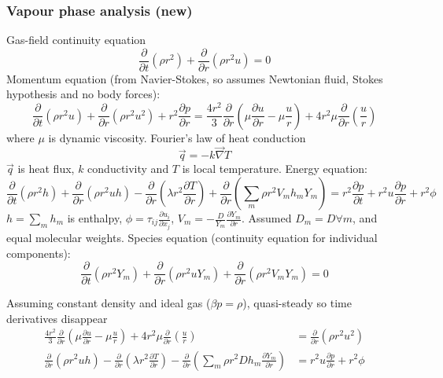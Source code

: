 \documentclass[12pt]{report}
\begin{document}
\subsubsection{Vapour phase analysis (new)}

Gas-field continuity equation
\begin{equation}
  \frac{\partial}{\partial t} ( \rho r^2 ) +
  \frac{\partial}{\partial r} ( \rho r^2 u ) = 0
\end{equation}
Momentum equation (from Navier-Stokes, so assumes Newtonian fluid, Stokes hypothesis and no body forces):
\begin{equation}
  \frac{\partial}{\partial t} ( \rho r^2 u ) +
  \frac{\partial}{\partial r} ( \rho r^2 u^2 ) +
  r^2 \frac{\partial p}{\partial r}
  = \frac{4 r^2}{3} \frac{\partial}{\partial r}
  \left( \mu \frac{\partial u}{\partial r} - \mu \frac{u}{r} \right)
  + 4 r^2 \mu \frac{\partial}{\partial r} \left( \frac{u}{r} \right)
\end{equation}
where $\mu$ is dynamic viscosity.
Fourier's law of heat conduction
\begin{equation}
  \vec{q} = -k \vec{\nabla} T
\end{equation}
$\vec{q}$ is heat flux, $k$ conductivity and $T$ is local temperature.
Energy equation:
\begin{equation}
  \frac{\partial}{\partial t} ( \rho r^2 h ) +
  \frac{\partial}{\partial r} ( \rho r^2 u h ) -
  \frac{\partial}{\partial r} ( \lambda r^2 \frac{\partial T}{\partial r} ) +
  \frac{\partial}{\partial r} ( \sum_m \rho r^2 V_m h_m Y_m ) =
  r^2 \frac{\partial p}{\partial t} +
  r^2 u \frac{\partial p}{\partial r} + r^2 \phi
\end{equation}
$h = \sum_m h_m$ is enthalpy, $\phi = \tau_{ij} \frac{\partial u_i}{\partial x_j}$, $V_m = - \frac{D}{Y_m} \frac{\partial Y_m}{\partial r}$.
Assumed $D_m = D \forall m$, and equal molecular weights.
Species equation (continuity equation for individual components):
\begin{equation}
  \frac{\partial}{\partial t} ( \rho r^2 Y_m ) +
  \frac{\partial}{\partial r} ( \rho r^2 u Y_m ) +
  \frac{\partial}{\partial r} ( \rho r^2 V_m Y_m ) = 0
\end{equation}

Assuming constant density and ideal gas ($\beta p = \rho$), quasi-steady so time derivatives disappear
\begin{align}
  \frac{4 r^2}{3} \frac{\partial}{\partial r}
  \left( \mu \frac{\partial u}{\partial r} - \mu \frac{u}{r} \right)
  + 4 r^2 \mu \frac{\partial}{\partial r} \left( \frac{u}{r} \right)
  &= \frac{\partial}{\partial r} ( \rho r^2 u^2 ) \\
  \frac{\partial}{\partial r} ( \rho r^2 u h ) -
  \frac{\partial}{\partial r} ( \lambda r^2 \frac{\partial T}{\partial r} ) -
  \frac{\partial}{\partial r} ( \sum_m \rho r^2 D h_m \frac{\partial Y_m}{\partial r} ) &=
  r^2 u \frac{\partial p}{\partial r} + r^2 \phi
\end{align}
\end{document}
